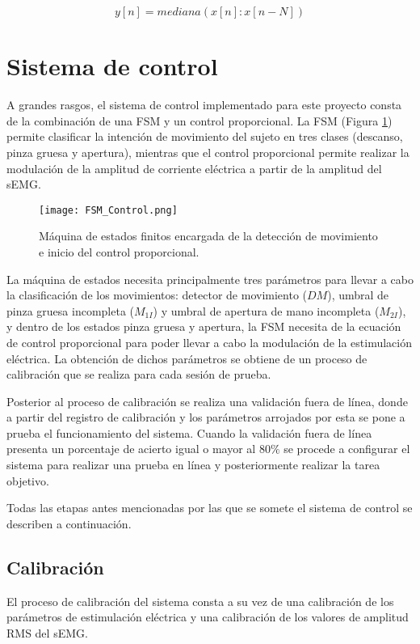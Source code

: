 \begin{equation}
	y[n] = mediana(x[n]:x[n-N])
	\label{Ecu: Mediana}
\end{equation}


\newpage
\section{Sistema de control}
A grandes rasgos, el sistema de control implementado para este proyecto consta de la combinación de una FSM y un control proporcional. La FSM (Figura \ref{Figura: FSM_Control}) permite clasificar la intención de movimiento del sujeto en tres clases (descanso, pinza gruesa y apertura), mientras que el control proporcional permite realizar la modulación de la amplitud de corriente eléctrica a partir de la amplitud del sEMG.

\begin{figure}[htbp]
	\centering
	\texttt{[image: FSM\_Control.png]}
	\caption[FSM para control]{Máquina de estados finitos encargada de la detección de movimiento e inicio del control proporcional.}
	\label{Figura: FSM_Control}
\end{figure}

La máquina de estados necesita principalmente tres parámetros para llevar a cabo la clasificación de los movimientos: detector de movimiento ($DM$), umbral de pinza gruesa incompleta ($M_{1I}$) y umbral de apertura de mano incompleta ($M_{2I}$), y dentro de los estados pinza gruesa y apertura, la FSM necesita de la ecuación de control proporcional para poder llevar a cabo la modulación de la estimulación eléctrica. La obtención de dichos parámetros se obtiene de un proceso de calibración que se realiza para cada sesión de prueba.

Posterior al proceso de calibración se realiza una validación fuera de línea, donde a partir del registro de calibración y los parámetros arrojados por esta se pone a prueba el funcionamiento del sistema. Cuando la validación fuera de línea presenta un porcentaje de acierto igual o mayor al 80$\%$ se procede a configurar el sistema para realizar una prueba en línea y posteriormente realizar la tarea objetivo.

Todas las etapas antes mencionadas por las que se somete el sistema de control se describen a continuación.

\subsection{Calibración}
El proceso de calibración del sistema consta a su vez de una calibración de los parámetros de estimulación eléctrica y una calibración de los valores de amplitud RMS del sEMG.

